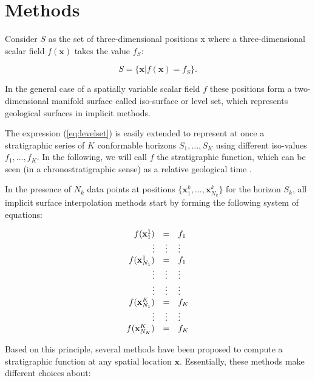 \documentclass[preprint]{elsarticle}
\begin{document}
\section{Methods}
\label{sec:methods}

Consider $S$ as the set of three-dimensional positions {x} where a three-dimensional scalar field $f(\mathbf{x})$ takes the value $f_S$: 

\begin{equation}
\label{eq:levelset}
  S = \{\mathbf{x} | f(\mathbf{x}) = f_S\}.
\end{equation}

In the general case of a spatially variable scalar field $f$ these positions form a two-dimensional manifold surface called iso-surface or level set, which represents geological surfaces in implicit methods. 

The expression (\ref{eq:levelset}) is easily extended to represent 
at once a stratigraphic series of $K$ conformable horizons 
$S_1, \ldots, S_K$ using different iso-values $f_1, \ldots, f_K$. 
In the following, we will call $f$ the stratigraphic function, which can be seen 
(in a chronostratigraphic sense) as a relative geological time \citep{Mallet2004MG,Lomask2006G,Wu2012G}.

In the presence of $N_k$ data points at positions $\{\mathbf{x}_1^k, \ldots, \mathbf{x}_{N_k}^k\}$ for the horizon $S_k$, all implicit surface interpolation methods start by forming the following system of equations: 

\begin{equation}
\label{eq:datasystem}
\begin{array}{r c l}
f(\mathbf{x}_1^1) & = & f_1 \\
\vdots & \vdots & \vdots \\
f(\mathbf{x}_{N_1}^1) & = & f_1 \\
\vdots & \vdots & \vdots \\
\vdots & \vdots & \vdots \\
f(\mathbf{x}_{N_1}^K) & = & f_K \\
\vdots & \vdots & \vdots \\
f(\mathbf{x}_{N_K}^K) & = & f_K \\
\end{array}
\end{equation}

Based on this principle, several methods have been proposed to compute a stratigraphic function at any spatial location $\mathbf{x}$. Essentially, these methods make different choices about:
 
\end{document}
